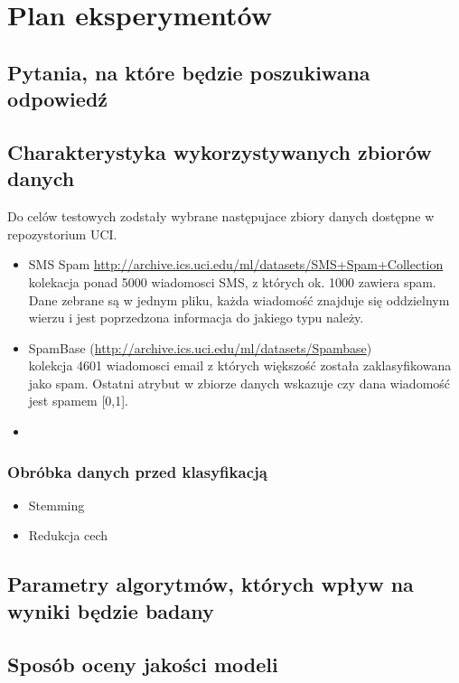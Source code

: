 \documentclass[a4paper, 10pt]{article}
\begin{document}

\section{Plan eksperymentów}
\subsection{Pytania, na które będzie poszukiwana odpowiedź}

\subsection{Charakterystyka wykorzystywanych zbiorów danych}

Do celów testowych zodstały wybrane następujace zbiory danych dostępne w repozystorium UCI.


\begin{itemize}
\item{SMS Spam \url{http://archive.ics.uci.edu/ml/datasets/SMS+Spam+Collection} \\ kolekacja ponad 5000 wiadomosci SMS, z których ok. 1000 zawiera spam. Dane zebrane są w jednym pliku, każda wiadomość znajduje się oddzielnym wierzu i 
jest poprzedzona informacja do jakiego typu należy.} 
\item{SpamBase (\url{http://archive.ics.uci.edu/ml/datasets/Spambase}) \\ kolekcja 4601 wiadomosci email z których większość została zaklasyfikowana jako spam. Ostatni atrybut w zbiorze danych wskazuje czy dana wiadomość jest spamem [0,1].}
\item{} 
\end{itemize}



\subsubsection{Obróbka danych przed klasyfikacją}

\begin{itemize}
\item{Stemming}
\item{Redukcja cech}
\end{itemize}


\subsection{Parametry algorytmów, których wpływ na wyniki będzie badany}


\subsection{Sposób oceny jakości modeli}

\nocite{*}

\end{document}

